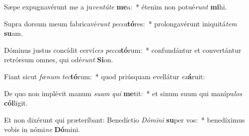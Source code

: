 \item Sæpe expugnavérunt me a ju\textit{ven}\textit{tú}\textit{te} \textbf{me}a:~* étenim non potué\textit{runt} \textbf{mi}hi.
\item Supra dorsum meum fabricavé\textit{runt} \textit{pec}\textit{ca}\textbf{tó}res:~* prolongavérunt iniquitá\textit{tem} \textbf{su}am.
\item Dóminus justus concídit cerví\textit{ces} \textit{pec}\textit{ca}\textbf{tó}rum:~* confundántur et convertántur retrórsum omnes, qui odé\textit{runt} \textbf{Si}on.
\item Fiant sicut \textit{fœ}\textit{num} \textit{tec}\textbf{tó}rum:~* quod priúsquam evellátur \textit{ex}\textbf{á}ruit:
\item De quo non implévit manum \textit{su}\textit{am} \textit{qui} \textbf{me}tit:~* et sinum suum qui manípu\textit{los} \textbf{cól}ligit.
\item Et non dixérunt qui præteríbant: Benedíctio \textit{Dó}\textit{mi}\textit{ni} \textbf{su}per vos:~* benedíximus vobis in nómi\textit{ne} \textbf{Dó}mini.

